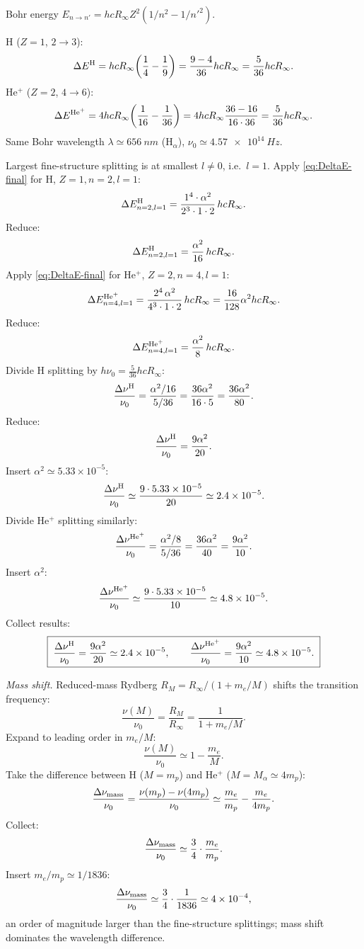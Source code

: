\documentclass[11pt]{article}
\begin{document}
Bohr energy $E_{n\to n'}=hcR_\infty Z^2(1/n^2-1/n'^2)$.

H ($Z=1$, $2\to 3$):
\[
\Delta E^{\rm H}=hcR_\infty\!\left(\frac{1}{4}-\frac{1}{9}\right)=\frac{9-4}{36}hcR_\infty=\frac{5}{36}hcR_\infty.
\]
He$^+$ ($Z=2$, $4\to 6$):
\[
\Delta E^{\rm He^+}=4 hcR_\infty\!\left(\frac{1}{16}-\frac{1}{36}\right)=4hcR_\infty\frac{36-16}{16\cdot 36}=\frac{5}{36}hcR_\infty.
\]
Same Bohr wavelength $\lambda\simeq\SI{656}{nm}$ (H$_\alpha$), $\nu_0\simeq\SI{4.57e14}{Hz}$.

Largest fine-structure splitting is at smallest $l\neq 0$, i.e.\ $l=1$. Apply \eqref{eq:DeltaE-final} for H, $Z=1, n=2, l=1$:
\[
\Delta E^{\rm H}_{n=2,l=1}=\frac{1^{4}\cdot\alpha^{2}}{2^{3}\cdot 1\cdot 2}\,hcR_\infty.
\]
Reduce:
\[
\Delta E^{\rm H}_{n=2,l=1}=\frac{\alpha^{2}}{16}\,hcR_\infty.
\]
Apply \eqref{eq:DeltaE-final} for He$^+$, $Z=2, n=4, l=1$:
\[
\Delta E^{\rm He^+}_{n=4,l=1}=\frac{2^{4}\,\alpha^{2}}{4^{3}\cdot 1\cdot 2}\,hcR_\infty=\frac{16}{128}\alpha^{2}hcR_\infty.
\]
Reduce:
\[
\Delta E^{\rm He^+}_{n=4,l=1}=\frac{\alpha^{2}}{8}\,hcR_\infty.
\]
Divide H splitting by $h\nu_0=\tfrac{5}{36}hcR_\infty$:
\[
\frac{\Delta\nu^{\rm H}}{\nu_0}=\frac{\alpha^{2}/16}{5/36}=\frac{36\alpha^{2}}{16\cdot 5}=\frac{36\alpha^{2}}{80}.
\]
Reduce:
\[
\frac{\Delta\nu^{\rm H}}{\nu_0}=\frac{9\alpha^{2}}{20}.
\]
Insert $\alpha^{2}\simeq 5.33\times 10^{-5}$:
\[
\frac{\Delta\nu^{\rm H}}{\nu_0}\simeq\frac{9\cdot 5.33\times 10^{-5}}{20}\simeq 2.4\times 10^{-5}.
\]
Divide He$^+$ splitting similarly:
\[
\frac{\Delta\nu^{\rm He^+}}{\nu_0}=\frac{\alpha^{2}/8}{5/36}=\frac{36\alpha^{2}}{40}=\frac{9\alpha^{2}}{10}.
\]
Insert $\alpha^{2}$:
\[
\frac{\Delta\nu^{\rm He^+}}{\nu_0}\simeq\frac{9\cdot 5.33\times 10^{-5}}{10}\simeq 4.8\times 10^{-5}.
\]
Collect results:
\begin{equation}
\boxed{\;\frac{\Delta\nu^{\rm H}}{\nu_0}=\frac{9\alpha^{2}}{20}\simeq 2.4\times 10^{-5},\qquad
\frac{\Delta\nu^{\rm He^+}}{\nu_0}=\frac{9\alpha^{2}}{10}\simeq 4.8\times 10^{-5}.\;}
\label{eq:fs-fractions}
\end{equation}

\textit{Mass shift.} Reduced-mass Rydberg $R_M=R_\infty/(1+m_e/M)$ shifts the transition frequency:
\[
\frac{\nu(M)}{\nu_0}=\frac{R_M}{R_\infty}=\frac{1}{1+m_e/M}.
\]
Expand to leading order in $m_e/M$:
\[
\frac{\nu(M)}{\nu_0}\simeq 1-\frac{m_e}{M}.
\]
Take the difference between H ($M=m_p$) and He$^+$ ($M=M_\alpha\simeq 4m_p$):
\[
\frac{\Delta\nu_{\rm mass}}{\nu_0}=\frac{\nu(m_p)-\nu(4m_p)}{\nu_0}\simeq\frac{m_e}{m_p}-\frac{m_e}{4m_p}.
\]
Collect:
\[
\frac{\Delta\nu_{\rm mass}}{\nu_0}\simeq\frac{3}{4}\cdot\frac{m_e}{m_p}.
\]
Insert $m_e/m_p\simeq 1/1836$:
\[
\frac{\Delta\nu_{\rm mass}}{\nu_0}\simeq\frac{3}{4}\cdot\frac{1}{1836}\simeq 4\times 10^{-4},
\]
an order of magnitude larger than the fine-structure splittings; mass shift dominates the wavelength difference.
\end{document}

